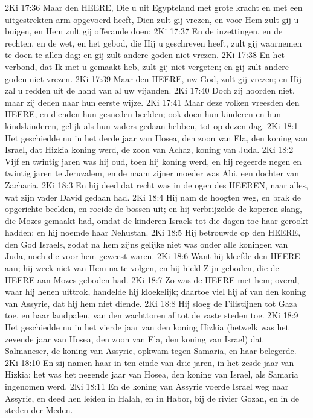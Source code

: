 2Ki 17:36  Maar den HEERE, Die u uit Egypteland met grote kracht en met een uitgestrekten arm opgevoerd heeft, Dien zult gij vrezen, en voor Hem zult gij u buigen, en Hem zult gij offerande doen;
2Ki 17:37  En de inzettingen, en de rechten, en de wet, en het gebod, die Hij u geschreven heeft, zult gij waarnemen te doen te allen dag; en gij zult andere goden niet vrezen.
2Ki 17:38  En het verbond, dat Ik met u gemaakt heb, zult gij niet vergeten; en gij zult andere goden niet vrezen.
2Ki 17:39  Maar den HEERE, uw God, zult gij vrezen; en Hij zal u redden uit de hand van al uw vijanden.
2Ki 17:40  Doch zij hoorden niet, maar zij deden naar hun eerste wijze.
2Ki 17:41  Maar deze volken vreesden den HEERE, en dienden hun gesneden beelden; ook doen hun kinderen en hun kindskinderen, gelijk als hun vaders gedaan hebben, tot op dezen dag.
2Ki 18:1  Het geschiedde nu in het derde jaar van Hosea, den zoon van Ela, den koning van Israel, dat Hizkia koning werd, de zoon van Achaz, koning van Juda.
2Ki 18:2  Vijf en twintig jaren was hij oud, toen hij koning werd, en hij regeerde negen en twintig jaren te Jeruzalem, en de naam zijner moeder was Abi, een dochter van Zacharia.
2Ki 18:3  En hij deed dat recht was in de ogen des HEEREN, naar alles, wat zijn vader David gedaan had.
2Ki 18:4  Hij nam de hoogten weg, en brak de opgerichte beelden, en roeide de bossen uit; en hij verbrijzelde de koperen slang, die Mozes gemaakt had, omdat de kinderen Israels tot die dagen toe haar gerookt hadden; en hij noemde haar Nehustan.
2Ki 18:5  Hij betrouwde op den HEERE, den God Israels, zodat na hem zijns gelijke niet was onder alle koningen van Juda, noch die voor hem geweest waren.
2Ki 18:6  Want hij kleefde den HEERE aan; hij week niet van Hem na te volgen, en hij hield Zijn geboden, die de HEERE aan Mozes geboden had.
2Ki 18:7  Zo was de HEERE met hem; overal, waar hij henen uittrok, handelde hij kloekelijk; daartoe viel hij af van den koning van Assyrie, dat hij hem niet diende.
2Ki 18:8  Hij sloeg de Filistijnen tot Gaza toe, en haar landpalen, van den wachttoren af tot de vaste steden toe.
2Ki 18:9  Het geschiedde nu in het vierde jaar van den koning Hizkia (hetwelk was het zevende jaar van Hosea, den zoon van Ela, den koning van Israel) dat Salmaneser, de koning van Assyrie, opkwam tegen Samaria, en haar belegerde.
2Ki 18:10  En zij namen haar in ten einde van drie jaren, in het zesde jaar van Hizkia; het was het negende jaar van Hosea, den koning van Israel, als Samaria ingenomen werd.
2Ki 18:11  En de koning van Assyrie voerde Israel weg naar Assyrie, en deed hen leiden in Halah, en in Habor, bij de rivier Gozan, en in de steden der Meden.
